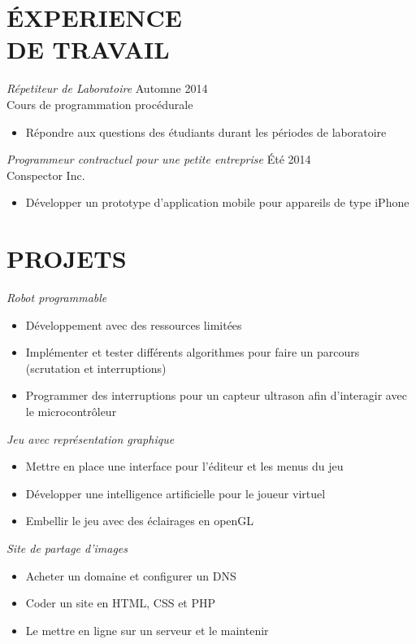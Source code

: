 \documentclass[margin, 10pt]{res} %
\begin{document}
\begin{resume}
\section{\'EXPERIENCE \\ DE TRAVAIL}

{\sl R\'epetiteur de Laboratoire} \hfill Automne 2014 \\
Cours de programmation proc\'edurale
\begin{itemize} \itemsep -2pt %
\item R\'epondre aux questions des \'etudiants durant les p\'eriodes de laboratoire
\end{itemize}

{\sl Programmeur contractuel pour une petite entreprise} \hfill \'Et\'e 2014 \\
Conspector Inc.
\begin{itemize} \itemsep -2pt %
\item D\'evelopper un prototype d'application mobile pour appareils de type iPhone
\end{itemize} 

 
\section{PROJETS}

{\sl Robot programmable}
\begin{itemize} \itemsep -2pt %
\item D\'eveloppement avec des ressources limit\'ees
\item Impl\'ementer et tester diff\'erents algorithmes pour faire un parcours (scrutation et interruptions)
\item Programmer des interruptions pour un capteur ultrason afin d'interagir avec le microcontr\^oleur

\end{itemize}
 
{\sl Jeu avec repr\'esentation graphique}
\begin{itemize} \itemsep -2pt %
\item Mettre en place une interface pour l'\'editeur et les menus du jeu
\item D\'evelopper une intelligence artificielle pour le joueur virtuel
\item Embellir le jeu avec des \'eclairages en openGL
\end{itemize}

{\sl Site de partage d'images}
\begin{itemize} \itemsep -2pt %
\item Acheter un domaine et configurer un DNS
\item Coder un site en HTML, CSS et PHP
\item Le mettre en ligne sur un serveur et le maintenir
\end{itemize}


\end{resume}
\end{document}
